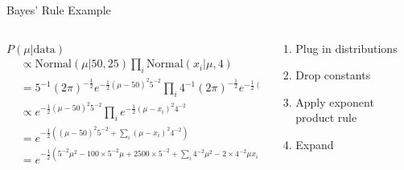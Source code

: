 \documentclass[aspectratio=169]{beamer}
\begin{document}
\begin{frame}{Bayes' Rule Example}
\begin{columns}[T]
\begin{column}{0.7\textwidth}
	$P(\mu | \textrm{data})$
	\begin{align}
	&\propto \textrm{Normal}(\mu|50, 25) \prod_i \textrm{Normal}(x_i|\mu, 4) \nonumber \\
		&= 5^{-1} (2\pi)^{-\frac{1}{2}}
                e^{-\frac{1}{2}(\mu - 50)^2 5^{-2}} \prod_i 4^{-1} (2\pi)^{-\frac{1}{2}}
                e^{-\frac{1}{2}(\mu - x_i)^2 4^{-2}}  \\
		&\propto e^{-\frac{1}{2}(\mu - 50)^2 5^{-2}} \prod_i e^{-\frac{1}{2}(\mu - x_i)^2 4^{-2}}  \\
		&= e^{-\frac{1}{2} \left( (\mu - 50)^2 5^{-2} + \sum_i (\mu - x_i)^2 4^{-2} \right)}  \\
		&= e^{-\frac{1}{2} \left( 5^{-2} \mu^2 - 100 \times 5^{-2} \mu + 2500 \times 5^{-2} +
			\sum_i 4^{-2} \mu^2 - 2 \times 4^{-2} \mu x_i + 4^{-2} x_i^2 \right)}  
	\end{align}
\end{column}
\begin{column}{0.3\textwidth}
\begin{enumerate}
\vspace{4.3em}
\item Plug in distributions
\vspace{1em}
\item Drop constants %
\vspace{1em}
\item Apply exponent product rule %
\vspace{.5em}
\item Expand
\end{enumerate}
\end{column}
\end{columns}
	

\end{frame}
\end{document}
